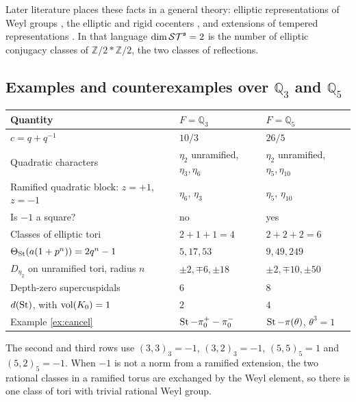Later literature places these facts in a general theory: elliptic representations of Weyl groups \cite{Re01}, the elliptic and rigid cocenters \cite{CH17,CH21}, and extensions of tempered representations \cite{OS13}. In that language $\dim\mathcal{ST}^{\mathfrak s}=2$ is the number of elliptic conjugacy classes of $\mathbb Z/2*\mathbb Z/2$, the two classes of reflections.

\subsection{Examples and counterexamples over $\mathbb Q_3$ and $\mathbb Q_5$}\label{sub:counter}
\begin{center}\small
\begin{tabular}{@{}p{.36\linewidth}p{.27\linewidth}p{.27\linewidth}@{}}\toprule
Quantity & $F=\mathbb Q_3$ & $F=\mathbb Q_5$\\\midrule
$c=q+q^{-1}$ & $10/3$ & $26/5$\\
Quadratic characters & $\eta_2$ unramified, $\eta_3,\eta_6$ & $\eta_2$ unramified, $\eta_5,\eta_{10}$\\
Ramified quadratic block: $z=+1$, $z=-1$ & $\eta_6$, $\eta_3$ & $\eta_5$, $\eta_{10}$\\
Is $-1$ a square? & no & yes\\
Classes of elliptic tori & $2+1+1=4$ & $2+2+2=6$\\
$\Theta_{\operatorname{St}}(a(1+p^n))=2q^n-1$ & $5,17,53$ & $9,49,249$\\
$D_{\eta_2}$ on unramified tori, radius $n$ & $\pm2,\mp6,\pm18$ & $\pm2,\mp10,\pm50$\\
Depth-zero supercuspidals & $6$ & $8$\\
$d(\operatorname{St})$, with $\operatorname{vol}(K_0)=1$ & $2$ & $4$\\
Example \ref{ex:cancel} & $\operatorname{St}-\pi_0^+-\pi_0^-$ & $\operatorname{St}-\pi(\theta)$, $\theta^3=1$\\\bottomrule
\end{tabular}
\end{center}
The second and third rows use $(3,3)_3=-1$, $(3,2)_3=-1$, $(5,5)_5=1$ and $(5,2)_5=-1$. When $-1$ is not a norm from a ramified extension, the two rational classes in a ramified torus are exchanged by the Weyl element, so there is one class of tori with trivial rational Weyl group.

